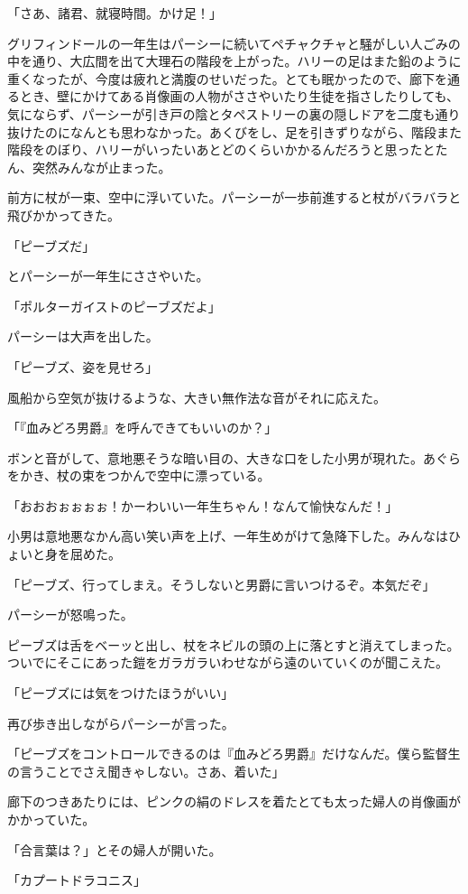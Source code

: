 \documentclass[10pt,a4paper]{article}
\begin{document}
\begin{CJK}{UTF8}{min}
「さあ、諸君、就寝時間。かけ足！」

グリフィンドールの一年生はパーシーに続いてペチャクチャと騒がしい人ごみの中を通り、大広間を出て大理石の階段を上がった。ハリーの足はまた鉛のように重くなったが、今度は疲れと満腹のせいだった。とても眠かったので、廊下を通るとき、壁にかけてある肖像画の人物がささやいたり生徒を指さしたりしても、気にならず、パーシーが引き戸の陰とタペストリーの裏の隠しドアを二度も通り抜けたのになんとも思わなかった。あくびをし、足を引きずりながら、階段また階段をのぼり、ハリーがいったいあとどのくらいかかるんだろうと思ったとたん、突然みんなが止まった。

前方に杖が一束、空中に浮いていた。パーシーが一歩前進すると杖がバラバラと飛びかかってきた。

「ピーブズだ」

とパーシーが一年生にささやいた。

「ポルターガイストのピーブズだよ」

パーシーは大声を出した。

「ピーブズ、姿を見せろ」

風船から空気が抜けるような、大きい無作法な音がそれに応えた。

「『血みどろ男爵』を呼んできてもいいのか？」

ボンと音がして、意地悪そうな暗い目の、大きな口をした小男が現れた。あぐらをかき、杖の束をつかんで空中に漂っている。

「おおおぉぉぉぉ！かーわいい一年生ちゃん！なんて愉快なんだ！」

小男は意地悪なかん高い笑い声を上げ、一年生めがけて急降下した。みんなはひょいと身を屈めた。

「ピーブズ、行ってしまえ。そうしないと男爵に言いつけるぞ。本気だぞ」

パーシーが怒鳴った。

ピーブズは舌をベーッと出し、杖をネビルの頭の上に落とすと消えてしまった。ついでにそこにあった鎧をガラガラいわせながら遠のいていくのが聞こえた。

「ピーブズには気をつけたほうがいい」

再び歩き出しながらパーシーが言った。

「ピーブズをコントロールできるのは『血みどろ男爵』だけなんだ。僕ら監督生の言うことでさえ聞きゃしない。さあ、着いた」

廊下のつきあたりには、ピンクの絹のドレスを着たとても太った婦人の肖像画がかかっていた。

「合言葉は？」とその婦人が開いた。

「カプートドラコニス」


\end{CJK}
\end{document}
